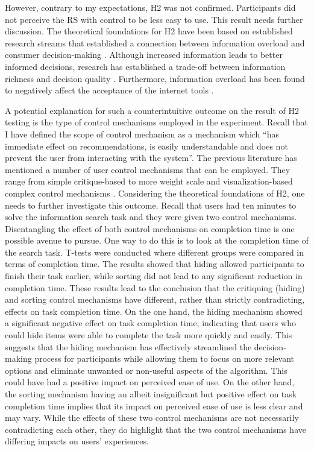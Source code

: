 \documentclass[a4paper,12pt]{article}
\begin{document}
However, contrary to my expectations, H2 was not confirmed. Participants did not perceive the RS with control to be less easy to use. This result needs further discussion. The theoretical foundations for H2 have been based on established research streams that established a connection between information overload and consumer decision-making \citep{jacoby1974brand, chenEffectsInformationOverload2009}. Although increased information leads to better informed decisions, research has established a trade-off between information richness and decision quality \citep{jacoby1974brand, malhotra1982information}. Furthermore, information overload has been found to negatively affect the acceptance of the internet tools \citep{shih2004extended}. 

A potential explanation for such a counterintuitive outcome on the result of H2 testing is the type of control mechanisms employed in the experiment. Recall that I have defined the scope of control mechanism as a mechanism which ``has immediate effect on recommendations, is easily understandable and does not prevent the user from interacting with the system''. The previous literature has mentioned a number of user control mechanisms that can be employed. They range from simple critique-based to more weight scale and visualization-based complex control mechanisms \citep{jannach2017user, jinEffectsPersonalCharacteristics2018}. Considering the theoretical foundations of H2, one needs to further investigate this outcome. Recall that users had ten minutes to solve the information search task and they were given two control mechanisms. Disentangling the effect of both control mechanisms on completion time is one possible avenue to pursue. One way to do this is to look at the completion time of the search task. T-tests were conducted where different groups were compared in terms of completion time. The results showed that hiding allowed participants to finish their task earlier, while sorting did not lead to any significant reduction in completion time. These results lead to the conclusion that the critiquing (hiding) and sorting control mechanisms have different, rather than strictly contradicting, effects on task completion time. On the one hand, the hiding mechanism showed a significant negative effect on task completion time, indicating that users who could hide items were able to complete the task more quickly and easily. This suggests that the hiding mechanism has effectively streamlined the decision-making process for participants while allowing them to focus on more relevant options and eliminate unwanted or non-useful aspects of the algorithm. This could have had a positive impact on perceived ease of use. On the other hand, the sorting mechanism having an albeit insignificant but positive effect on task completion time implies that its impact on perceived ease of use is less clear and may vary. While the effects of these two control mechanisms are not necessarily contradicting each other, they do highlight that the two control mechanisms have differing impacts on users' experiences. 
\end{document}

